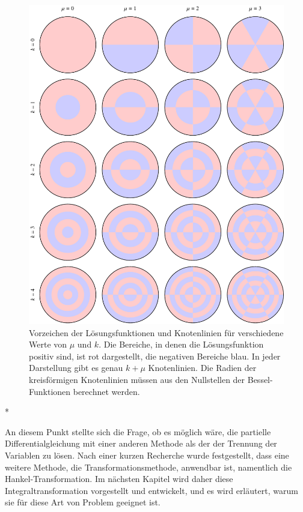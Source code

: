 \begin{figure}
	\centering
	\includegraphics[width=\textwidth]{chapters/090-pde/bessel/pauke.pdf}
	\caption{Vorzeichen der Lösungsfunktionen und Knotenlinien
		für verschiedene Werte von $\mu$ und $k$.
		Die Bereiche, in denen die Lösungsfunktion positiv sind, ist 
		rot dargestellt, die negativen Bereiche blau.
		In jeder Darstellung gibt es genau $k+\mu$ Knotenlinien.
		Die Radien der kreisförmigen Knotenlinien müssen aus den Nullstellen
		der Bessel-Funktionen berechnet werden.
		\label{buch:pde:kreis:fig:pauke}}
\end{figure}

\begin{center}
	* \quad *\quad *
\end{center}
An diesem Punkt stellte sich die Frage, ob es möglich wäre,
die partielle Differentialgleichung mit einer anderen Methode
als der der Trennung der Variablen zu lösen.
Nach einer kurzen Recherche wurde festgestellt, dass eine weitere
Methode, die Transformationsmethode, anwendbar ist, namentlich
die Hankel-Transformation.
Im nächsten Kapitel wird daher diese Integraltransformation vorgestellt
und entwickelt, und es wird erläutert, warum sie für diese Art von
Problem geeignet ist.
